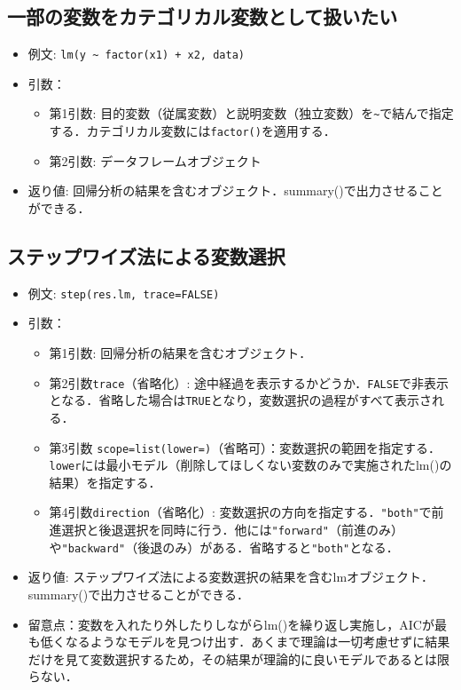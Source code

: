 \documentclass[
  xelatex, ja=standard]{bxjsarticle}
\providecommand{\tightlist}{%
  \setlength{\itemsep}{0pt}\setlength{\parskip}{0pt}}
\begin{document}
\subsection{一部の変数をカテゴリカル変数として扱いたい}\label{ux4e00ux90e8ux306eux5909ux6570ux3092ux30abux30c6ux30b4ux30eaux30abux30ebux5909ux6570ux3068ux3057ux3066ux6271ux3044ux305fux3044}

\begin{itemize}
\tightlist
\item
  例文: \texttt{lm(y\ \textasciitilde{}\ factor(x1)\ +\ x2,\ data)}
\item
  引数：

  \begin{itemize}
  \tightlist
  \item
    第1引数:
    目的変数（従属変数）と説明変数（独立変数）を\texttt{\textasciitilde{}}で結んで指定する．カテゴリカル変数には\texttt{factor()}を適用する．
  \item
    第2引数: データフレームオブジェクト
  \end{itemize}
\item
  返り値:
  回帰分析の結果を含むオブジェクト．summary()で出力させることができる．
\end{itemize}

\subsection{ステップワイズ法による変数選択}\label{ux30b9ux30c6ux30c3ux30d7ux30efux30a4ux30baux6cd5ux306bux3088ux308bux5909ux6570ux9078ux629e}

\begin{itemize}
\tightlist
\item
  例文: \texttt{step(res.lm,\ trace=FALSE)}
\item
  引数：

  \begin{itemize}
  \tightlist
  \item
    第1引数: 回帰分析の結果を含むオブジェクト．
  \item
    第2引数\texttt{trace}（省略化）:
    途中経過を表示するかどうか．\texttt{FALSE}で非表示となる．省略した場合は\texttt{TRUE}となり，変数選択の過程がすべて表示される．
  \item
    第3引数
    \texttt{scope=list(lower=)}（省略可）：変数選択の範囲を指定する．\texttt{lower}には最小モデル（削除してほしくない変数のみで実施されたlm()の結果）を指定する．
  \item
    第4引数\texttt{direction}（省略化）:
    変数選択の方向を指定する．\texttt{"both"}で前進選択と後退選択を同時に行う．他には\texttt{"forward"}（前進のみ）や\texttt{"backward"}（後退のみ）がある．省略すると\texttt{"both"}となる．
  \end{itemize}
\item
  返り値:
  ステップワイズ法による変数選択の結果を含むlmオブジェクト．summary()で出力させることができる．
\item
  留意点：変数を入れたり外したりしながらlm()を繰り返し実施し，AICが最も低くなるようなモデルを見つけ出す．あくまで理論は一切考慮せずに結果だけを見て変数選択するため，その結果が理論的に良いモデルであるとは限らない．
\end{itemize}
\end{document}
